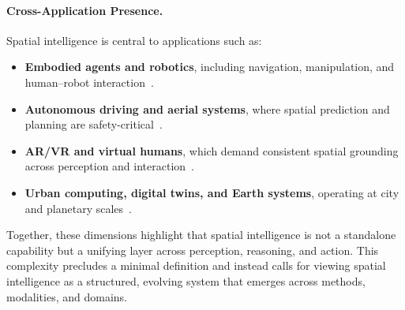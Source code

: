 \paragraph{Cross-Application Presence.}
Spatial intelligence is central to applications such as:
\begin{itemize}[leftmargin=2em,itemsep=0.35em]
    \item \textbf{Embodied agents and robotics}, including navigation, manipulation, and human–robot interaction~\cite{Xia2018Gibson,feng2025survey,zitkovich2023rt2}.
    \item \textbf{Autonomous driving and aerial systems}, where spatial prediction and planning are safety-critical~\cite{ettinger2021womd,muhammad2022vision}.
    \item \textbf{AR/VR and virtual humans}, which demand consistent spatial grounding across perception and interaction~\cite{chen2021hightracking,orts2016holoportation,HuLYHCYLY23}.
    \item \textbf{Urban computing, digital twins, and Earth systems}, operating at city and planetary scales~\cite{LuvizonNM17,mu2024robotwin,picard2021autonomousAgents}.
\end{itemize}





Together, these dimensions highlight that spatial intelligence is not a standalone capability but a unifying layer across perception, reasoning, and action. 
This complexity precludes a minimal definition and instead calls for viewing spatial intelligence as a structured, evolving system that emerges across methods, modalities, and domains.







